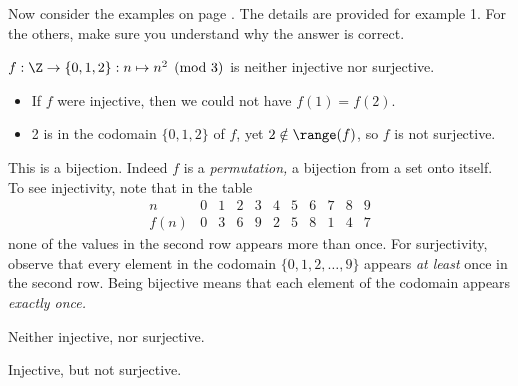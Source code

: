 Now consider the examples on page \pageref{ex:functmod1}. The details are provided for example 1. For the others, make sure you understand why the answer is correct. 
\begin{examples}
  \item $f:\Z\to\{0,1,2\}:n\mapsto n^2\pmod 3$ is neither injective nor surjective.
  	\begin{itemize}
  	  \item If $f$ were injective, then we could not have $f(1)=f(2)$.
  	  \item 2 is in the codomain $\{0,1,2\}$ of $f$, yet $2\notin\range(f)$, so $f$ is not surjective.
		\end{itemize}
  \item This is a bijection. Indeed $f$ is  a \emph{permutation,} a bijection from a set onto itself. To see injectivity, note that in the table
  \[\begin{array}{c|cccccccccc}
  n&0&1&2&3&4&5&6&7&8&9\\\hline
  f(n)&0&3&6&9&2&5&8&1&4&7
  \end{array}\]
  none of the values in the second row appears more than once. For surjectivity, observe that every element in the codomain $\{0,1,2,\ldots,9\}$ appears \emph{at least} once in the second row. Being bijective means that each element of the codomain appears \emph{exactly once.}
  \item Neither injective, nor surjective.
  \item Injective, but not surjective.
\end{examples}



